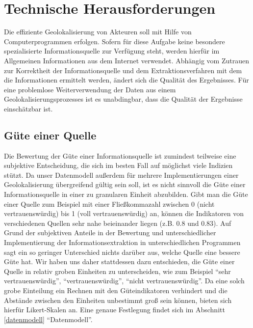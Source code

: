 \section{Technische Herausforderungen}
Die effiziente Geolokalisierung von Akteuren soll mit Hilfe von Computerprogrammen erfolgen. Sofern für diese Aufgabe keine besondere spezialisierte Informationsquelle zur Verfügung steht, werden hierfür im Allgemeinen Informationen aus dem Internet verwendet. Abhängig vom Zutrauen zur Korrektheit der Informationsquelle und dem Extraktionsverfahren mit dem die Informationen ermittelt werden, ändert sich die Qualität des Ergebnisses. Für eine problemlose Weiterverwendung der Daten aus einem Geolokalisierungsprozesses ist es unabdingbar, dass die Qualität der Ergebnisse einschätzbar ist.

\subsection{Güte einer Quelle}
Die Bewertung der Güte einer Informationsquelle ist zumindest teilweise eine subjektive Entscheidung, die sich im besten Fall auf möglichst viele Indizien stützt. Da unser Datenmodell außerdem für mehrere Implementierungen einer Geolokalisierung übergreifend gültig sein soll, ist es nicht sinnvoll die Güte einer Informationsquelle in einer zu granularen Einheit abzubilden. Gibt man die Güte einer Quelle zum Beispiel mit einer Fließkommazahl zwischen 0 (nicht vertrauenswürdig) bis 1 (voll vertrauenswürdig) an, können die Indikatoren von verschiedenen Quellen sehr nahe beieinander liegen (z.B. 0.8 und 0.83). Auf Grund der subjektiven Anteile in der Bewertung und unterschiedlicher Implementierung der Informationsextraktion in unterschiedlichen Programmen sagt ein so geringer Unterschied nichts darüber aus, welche Quelle eine bessere Güte hat. Wir haben uns daher stattdessen dazu entschieden, die Güte einer Quelle in relativ groben Einheiten zu unterscheiden, wie zum Beispiel ``sehr vertrauenswürdig'', ``vertrauenswürdig'', ``nicht vertrauenswürdig''. Da eine solch grobe Einteilung ein Rechnen mit den Güteindikatoren verhindert und die Abstände zwischen den Einheiten unbestimmt groß sein können, bieten sich hierfür Likert-Skalen an. Eine genaue Festlegung findet sich im Abschnitt \ref{datenmodell} ``Datenmodell''.

